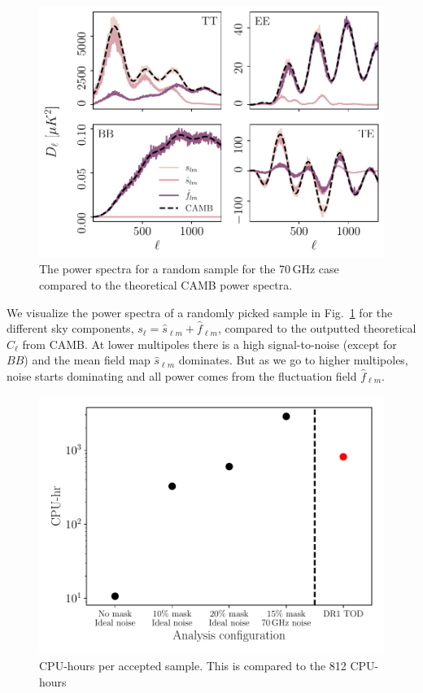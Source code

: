 \documentclass[twocolumn]{../common/aa}
\begin{document}
\begin{figure}
	\centering
	\includegraphics[width=\linewidth]{figures/sigma_ell.pdf}
	\caption{\label{fig:sigma_ell}The power spectra for a random sample for the 70\,GHz case compared to the theoretical CAMB power spectra.}
\end{figure}

We visualize the power spectra of a randomly picked sample in Fig.~\ref{fig:sigma_ell} for the different sky components, $s_{\ell} = \hat{s}_{\ell m} + \hat{f}_{\ell m}$, compared to the outputted theoretical $C_\ell$ from CAMB. At lower multipoles there is a high signal-to-noise (except for $BB$) and the mean field map $\hat{s}_{\ell m}$ dominates. But as we go to higher multipoles, noise starts dominating and all power comes from the fluctuation field $\hat{f}_{\ell m}$.

\begin{figure}
	\centering
	\includegraphics[width=\linewidth]{figures/run_time.pdf}
	\caption{\label{fig:runtime}CPU-hours per accepted sample. This is compared to the 812 CPU-hours }
\end{figure}
\end{document}
